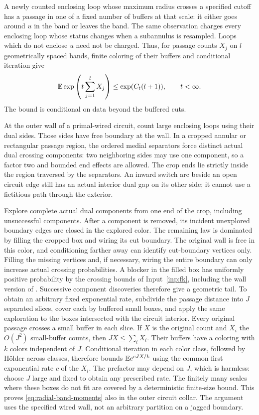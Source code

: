 A newly counted enclosing loop whose maximum radius crosses a specified
cutoff has a passage in one of a fixed number of buffers at that scale:
it either goes around $u$ in the band or leaves the band. The same
observation charges every enclosing loop whose status changes when a
subannulus is resampled. Loops which do not enclose $u$ need not be
charged. Thus, for passage counts $X_j$ on $l$ geometrically spaced
bands, finite coloring of their buffers and conditional iteration give
\begin{equation}\label{eq:radial-band-moments}
 \mathbb E\exp\left(t\sum_{j=1}^l X_j\right)
       \le \exp(C_t(l+1)),\qquad t<\infty.
\end{equation}
The bound is conditional on data beyond the buffered cuts.

At the outer wall of a primal-wired circuit, count large enclosing
loops using their dual sides. Those sides have free boundary at the
wall. In a cropped annular or rectangular passage region, the ordered
medial separators force distinct actual dual crossing components:
two neighboring sides may use one component, so a factor two and
bounded end effects are allowed. The crop ends lie strictly inside
the region traversed by the separators. An inward switch arc beside
an open circuit edge still has an actual interior dual gap on its
other side; it cannot use a fictitious path through the exterior.

Explore complete actual dual components from one end of the crop,
including unsuccessful components. After a component is removed, its
incident unexplored boundary edges are closed in the explored color.
The remaining law is dominated by filling the cropped box and wiring
its cut boundary. The original wall is free in this color, and
conditioning farther away can identify cut-boundary vertices only.
Filling the missing vertices and, if necessary, wiring the entire
boundary can only increase actual crossing probabilities. A blocker
in the filled box has uniformly positive probability by the crossing
bounds of Input~\ref{inp:fk}, including the wall version of
\cite[Theorem~1.2]{DMT}. Successive component discoveries therefore
give a geometric tail. To obtain an arbitrary fixed exponential rate,
subdivide the passage distance into $J$ separated slices, cover each
by buffered small boxes, and apply the same exploration to the boxes
intersected with the circuit interior. Every original passage crosses
a small buffer in each slice. If $X$ is the original count and $X_i$
the $O(J^2)$ small-buffer counts, then $JX\le\sum_iX_i$.
Their buffers have a coloring with $k$ colors independent of $J$.
Conditional iteration in each color class, followed by H\"older
across classes, therefore bounds
$\mathbb E e^{cJX/k}$ using the common first exponential rate $c$ of
the $X_i$. The prefactor may depend on $J$, which is harmless:
choose $J$ large and fixed to obtain any prescribed rate.
The finitely many scales where these boxes do not fit are covered by
a deterministic finite-size bound. This proves
\eqref{eq:radial-band-moments} also in the outer circuit collar.
The argument uses the specified wired wall, not an arbitrary partition
on a jagged boundary.

